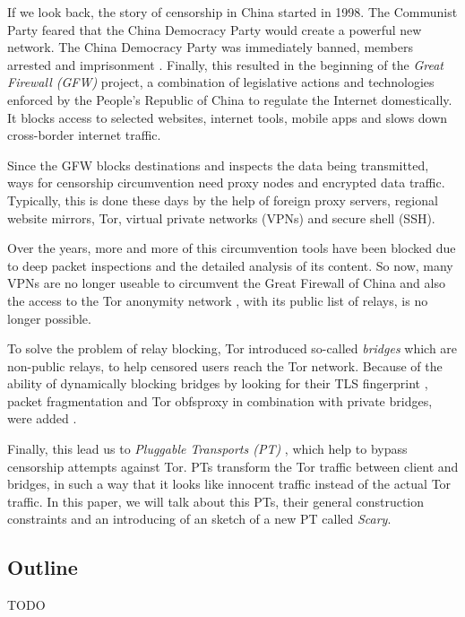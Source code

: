 \documentclass[sigconf, screen]{acmart}
\begin{document}
If we look back, the story of censorship in China started in 1998. The Communist Party feared that the China Democracy Party would create a powerful new network. The China Democracy Party was immediately banned, members arrested and imprisonment \cite{GreatFirewallWikiEn}. Finally, this resulted in the beginning of the \textit{Great Firewall (GFW)} project, a combination of legislative actions and technologies enforced by the People's Republic of China to regulate the Internet domestically. It blocks access to selected websites, internet tools, mobile apps and slows down cross-border internet traffic.

Since the GFW blocks destinations and inspects the data being transmitted, ways for censorship circumvention need proxy nodes and encrypted data traffic. Typically, this is done these days by the help of foreign proxy servers, regional website mirrors, Tor, virtual private networks (VPNs) and secure shell (SSH).

Over the years, more and more of this circumvention tools have been blocked due to deep packet inspections and the detailed analysis of its content. So now, many VPNs are no longer useable to circumvent the Great Firewall of China and also the access to the Tor anonymity network \cite{Tor}, with its public list of relays, is no longer possible. 

To solve the problem of relay blocking, Tor introduced so-called \textit{bridges} \cite{TorBridges} which are non-public relays, to help censored users reach the Tor network. Because of the ability of dynamically blocking bridges by looking for their TLS fingerprint \cite{foci12-winter} \cite{Ensafi2015AnalyzingTG}, packet fragmentation and Tor obfsproxy in combination with private bridges, were added \cite{foci12-winter}.

Finally, this lead us to \textit{Pluggable Transports (PT)} \cite{TorPluggableTransports}, which help to bypass censorship attempts against Tor. PTs transform the Tor traffic between client and bridges, in such a way that it looks like innocent traffic instead of the actual Tor traffic. In this paper, we will talk about this PTs, their general construction constraints and an introducing of an sketch of a new PT called \textit{Scary}.
\subsection{Outline}
\label{ss:outline}
TODO
\end{document}
